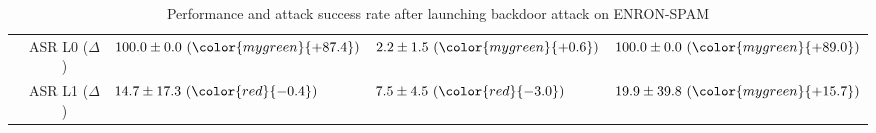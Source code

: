 \begin{table*}[!ht]
{\begin{tabular}{c | c | lll }
	& ASR L0 ($\Delta$)
	& $100.0 \pm 0.0 \ ({\color{mygreen}{+87.4}})$     %
	& $2.2 \pm 1.5  \ ({\color{mygreen}{+0.6}})$    %
	& $100.0 \pm 0.0  \ ({\color{mygreen}{+89.0}})$ \\ %
	
	& ASR L1 ($\Delta$)
	& $14.7 \pm 17.3 \ ({\color{red}{-0.4}})$     %
	& $7.5 \pm 4.5  \ ({\color{red}{-3.0}})$    %
	& $19.9 \pm 39.8  \ ({\color{mygreen}{+15.7}})$ \\ %
	
        \bottomrule
        \end{tabular}
 }
 \caption{Performance and attack success rate after launching backdoor attack on ENRON-SPAM}
 \label{tab:backdoor_perform_enron_spam}
\end{table*}

